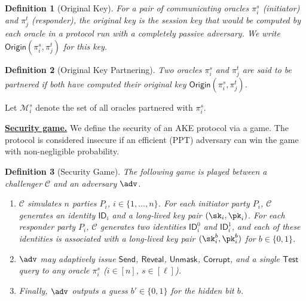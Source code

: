\documentclass[runningheads]{llncs}
\newtheorem{defn}{Definition}[]
\begin{document}
\begin{defn}[Original Key]
For a pair of communicating oracles $\pi_i^s$ (initiator) and $\pi_j^t$ (responder), the \textit{original key} is the session key that would be computed by each oracle in a protocol run with a completely passive adversary. We write $\mathsf{Origin}(\pi_i^s, \pi_j^t)$ for this key.
\end{defn}

\begin{defn}[Original Key Partnering]
Two oracles $\pi_i^s$ and $\pi_j^t$ are said to be \textit{partnered} if both have computed their original key $\mathsf{Origin}(\pi_i^s, \pi_j^t)$.
\end{defn}

Let $\mathcal{M}_i^s$ denote the set of all oracles partnered with $\pi_i^s$.

\smallskip\noindent\uline{\textbf{Security game.}}
We define the security of an AKE protocol via a game. The protocol is considered insecure if an efficient (PPT) adversary can win the game with non-negligible probability.

\begin{defn}[Security Game]
\label{ake sec game}
The following game is played between a challenger $\mathcal{C}$ and an adversary $\adv$.
\begin{enumerate}
\item $\mathcal{C}$ simulates $n$ parties $P_i$, $i \in \{1, \ldots, n\}$.
For each initiator party $P_i$, $\mathcal{C}$ generates an identity $\mathsf{ID}_i$ and a long-lived key pair $(\sk_i, \pk_i)$.
For each responder party $P_i$, $\mathcal{C}$ generates two identities $\mathsf{ID}_i^{0}$ and $\mathsf{ID}_i^{1}$, and each of these identities is associated with a long-lived key pair $(\sk_i^{b}, \pk_i^{b})$ for $b\in \{0,1\}$.
\item $\adv$ may adaptively issue $\textsf{Send}$, $\textsf{Reveal}$, $\textsf{Unmask}$, $\textsf{Corrupt}$, and a single $\textsf{Test}$ query to any oracle $\pi_i^s$ ($i \in [n]$, $s \in [\ell]$).
\item Finally, $\adv$ outputs a guess $b' \in \{0, 1\}$ for the hidden bit $b$.
\end{enumerate}
\end{defn}
\end{document}
